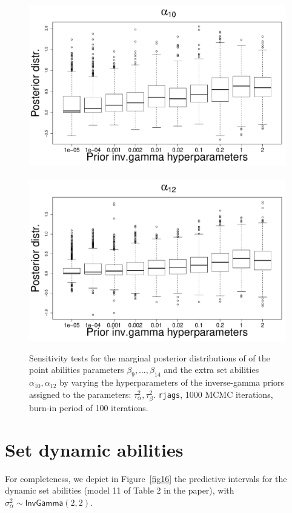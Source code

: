 \documentclass{statsoc}
\numberwithin{figure}{section}
\numberwithin{table}{section}
\begin{document}
\begin{figure}
\includegraphics[scale=0.25]{Sensitivity/alpha_10_sensitivity.pdf}~
\includegraphics[scale=0.25]{Sensitivity/alpha_12_sensitivity.pdf}\\
\caption{Sensitivity tests for the marginal posterior distributions of of the point abilities parameters $\beta_9, \ldots,\beta_{14}$ and the extra set abilities $\alpha_{10}, \alpha_{12}$ by varying the hyperparameters of the inverse-gamma priors assigned to the parameters: $\tau^2_{\alpha}, \tau^2_{\beta}$. {\tt rjags}, 1000 MCMC iterations, burn-in period of 100 iterations.}
\label{figS4}
\end{figure}


\clearpage 
\newpage

\section{Set dynamic abilities}

For completeness, we depict in Figure~\ref{fig16} the predictive intervals for the dynamic set abilities (model 11 of Table 2 in the paper), with $\sigma^2_{\alpha} \sim \mathsf{InvGamma}(2,2)$.
\end{document}
